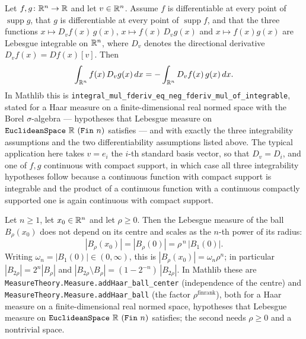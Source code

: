 \begin{proposition}
Let $f,g\colon\mathbb{R}^n\to\mathbb{R}$ and let $v\in\mathbb{R}^n$.  Assume $f$ is differentiable at
every point of $\operatorname{supp}g$, that $g$ is differentiable at every point
of $\operatorname{supp}f$, and that the three functions
$x\mapsto D_vf(x)\,g(x)$, $x\mapsto f(x)\,D_vg(x)$ and $x\mapsto f(x)g(x)$ are
Lebesgue integrable on $\mathbb{R}^n$, where $D_v$ denotes the directional derivative
$D_vf(x)=Df(x)[v]$.  Then
\[
\int_{\mathbb{R}^n}f(x)\,D_vg(x)\,dx=-\int_{\mathbb{R}^n}D_vf(x)\,g(x)\,dx .
\]
In Mathlib this is
\texttt{integral\_mul\_fderiv\_eq\_neg\_fderiv\_mul\_of\_integrable}, stated for
a Haar measure on a finite-dimensional real normed space with the Borel
$\sigma$-algebra --- hypotheses that Lebesgue measure on
$\texttt{EuclideanSpace}\ \R\ (\texttt{Fin}\ n)$ satisfies --- and with exactly
the three integrability assumptions and the two differentiability assumptions
listed above.  The typical application here takes $v=e_i$ the $i$-th standard
basis vector, so that $D_v=D_i$, and one of $f,g$ continuous with compact
support, in which case all three integrability hypotheses follow because a
continuous function with compact support is integrable and the product of a
continuous function with a continuous compactly supported one is again
continuous with compact support.
\end{proposition}

\begin{proposition}
Let $n\ge1$, let $x_0\in\mathbb{R}^n$ and let $\rho\ge0$.  Then the Lebesgue measure of
the ball $B_\rho(x_0)$ does not depend on its centre and scales as the $n$-th
power of its radius:
\[
|B_\rho(x_0)|=|B_\rho(0)|=\rho^{\,n}\,|B_1(0)| .
\]
Writing $\omega_n=|B_1(0)|\in(0,\infty)$, this is $|B_\rho(x_0)|=\omega_n\rho^n$;
in particular $|B_{2\rho}|=2^n|B_\rho|$ and
$|B_{2\rho}\setminus B_\rho|=(1-2^{-n})\,|B_{2\rho}|$.  In Mathlib these are
\texttt{MeasureTheory.Measure.addHaar\_ball\_center} (independence of the
centre) and \texttt{MeasureTheory.Measure.addHaar\_ball} (the factor
$\rho^{\operatorname{finrank}}$), both for a Haar measure on a
finite-dimensional real normed space, hypotheses that Lebesgue measure on
$\texttt{EuclideanSpace}\ \R\ (\texttt{Fin}\ n)$ satisfies; the second needs
$\rho\ge0$ and a nontrivial space.
\end{proposition}

